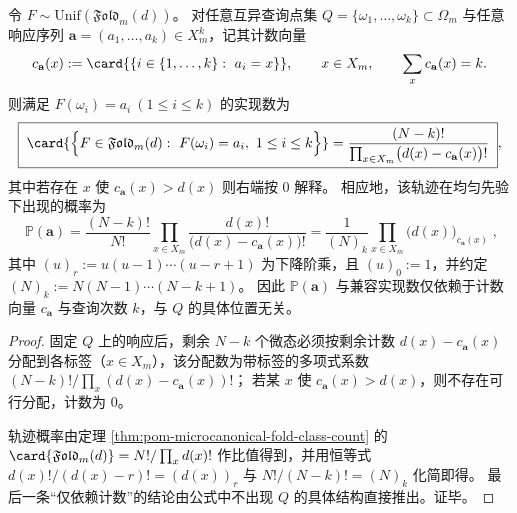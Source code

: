 \begin{theorem}[后验模空间的精确计数与轨迹概率]\label{thm:pom-microcanonical-fold-posterior-count-and-prob}
令 \(F\sim\mathrm{Unif}(\mathfrak{Fold}_m(d))\)。
对任意互异查询点集 \(Q=\{\omega_1,\dots,\omega_k\}\subset\Omega_m\) 与任意响应序列 \(\mathbf{a}=(a_1,\dots,a_k)\in X_m^k\)，记其计数向量
\[
c_{\mathbf{a}}(x):=\card{\{i\in\{1,\dots,k\}:\ a_i=x\}},\qquad x\in X_m,\qquad \sum_{x}c_{\mathbf{a}}(x)=k.
\]
则满足 \(F(\omega_i)=a_i\ (1\le i\le k)\) 的实现数为
\[
\boxed{\;
\card{\Bigl\{F\in\mathfrak{Fold}_m(d):\ F(\omega_i)=a_i,\ 1\le i\le k\Bigr\}}
=\frac{(N-k)!}{\prod_{x\in X_m}\bigl(d(x)-c_{\mathbf{a}}(x)\bigr)!}\;},
\]
其中若存在 \(x\) 使 \(c_{\mathbf{a}}(x)>d(x)\) 则右端按 \(0\) 解释。
相应地，该轨迹在均匀先验下出现的概率为
\[
\boxed{\;
\mathbb{P}(\mathbf{a})
=\frac{(N-k)!}{N!}\prod_{x\in X_m}\frac{d(x)!}{\bigl(d(x)-c_{\mathbf{a}}(x)\bigr)!}
=\frac{1}{(N)_k}\prod_{x\in X_m}\bigl(d(x)\bigr)_{c_{\mathbf{a}}(x)}\;},
\]
其中 \((u)_r:=u(u-1)\cdots(u-r+1)\) 为下降阶乘，且 \((u)_0:=1\)，并约定 \((N)_k:=N(N-1)\cdots(N-k+1)\)。
因此 \(\mathbb{P}(\mathbf{a})\) 与兼容实现数仅依赖于计数向量 \(c_{\mathbf{a}}\) 与查询次数 \(k\)，与 \(Q\) 的具体位置无关。
\end{theorem}
\begin{proof}
固定 \(Q\) 上的响应后，剩余 \(N-k\) 个微态必须按剩余计数
\(
d(x)-c_{\mathbf{a}}(x)
\)
分配到各标签（\(x\in X_m\)），该分配数为带标签的多项式系数
\(
(N-k)!/\prod_x(d(x)-c_{\mathbf{a}}(x))!
\)；
若某 \(x\) 使 \(c_{\mathbf{a}}(x)>d(x)\)，则不存在可行分配，计数为 \(0\)。
\par
轨迹概率由定理 \ref{thm:pom-microcanonical-fold-class-count} 的
\(
\card{\mathfrak{Fold}_m(d)}=N!/\prod_x d(x)!
\)
作比值得到，并用恒等式
\(
d(x)!/(d(x)-r)!= (d(x))_{r}
\)
与
\(
N!/(N-k)!=(N)_k
\)
化简即得。
最后一条“仅依赖计数”的结论由公式中不出现 \(Q\) 的具体结构直接推出。证毕。
\end{proof}





